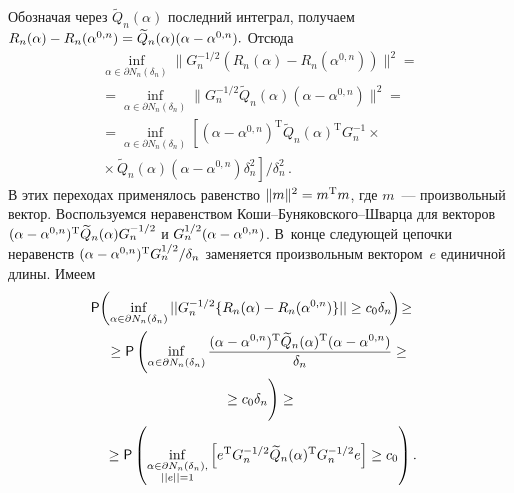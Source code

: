 \begin{multicols}{2}
Обозначая через $\widetilde{Q}_n(\alpha)$ последний интеграл, получаем 
$R_n(\alpha)\hm-R_n(\alpha^{0,n})\hm=\widetilde{Q}_n(\alpha)(\alpha\hm-\alpha^{0,n}).$ Отсюда
\begin{multline*}
\inf\limits_{\alpha\in\partial N_n(\delta_n)}\|G_n^{-1/2}(R_n(\alpha)-R_n(\alpha^{0,n}))\|^2={}\\
{}=\inf\limits_{\alpha\in\partial N_n(\delta_n)}\|G_n^{-1/2}\widetilde{Q}_n(\alpha)(\alpha-\alpha^{0,n})\|^2={}\\
{}=\inf\limits_{\alpha\in\partial N_n(\delta_n)}
\left[(\alpha-\alpha^{0,n})^{\mathrm{T}}\widetilde{Q}_n(\alpha)^{\mathrm{T}}G_n^{-1}\times{}\right.\\
\left.{}\times\widetilde{Q}_n(\alpha)
(\alpha-\alpha^{0,n})\delta_n^2\right]\Big /\delta_n^2\,.
\end{multline*}
В этих переходах применялось равенство $\|m\|^2\hm=m^{\mathrm{T}}m$, где $m$~--- произвольный вектор. 
Воспользуемся неравенством Ко\-ши--Бу\-ня\-ков\-ско\-го--Швар\-ца для 
векторов $(\alpha\hm-\alpha^{0,n})^{\mathrm{T}}\widetilde{Q}_n(\alpha)G_n^{-1/2}$ и 
$G_n^{1/2}(\alpha\hm-\alpha^{0,n})$. В~конце следующей цепочки неравенств 
$(\alpha\hm-\alpha^{0,n})^{\mathrm{T}}G_n^{1/2}/\delta_n$ заменяется произвольным вектором~$e$ 
единичной длины. Имеем
\begin{multline*}
\!\!\!\!\!\!\p\!\left(\inf\limits_{\alpha\in\partial N_n(\delta_n)}||G_n^{-1/2}\{R_n(\alpha)-
R_n(\alpha^{0,n})\}||\geq c_0\delta_n\!\right)\!\geq{}\hspace*{-1.26547pt}\\
{}\geq\p\left(\inf\limits_{\alpha\in\partial N_n(\delta_n)}\fr{
(\alpha-\alpha^{0,n})^{\mathrm{T}}\widetilde{Q}_n(\alpha)^{\mathrm{T}}(\alpha-\alpha^{0,n})}
{\delta_n}\geq{}\right.\\
\left.{}\geq c_0\delta_n
\vphantom{\fr{(\alpha-\alpha^{0,n})^{\mathrm{T}}\widetilde{Q}_n(\alpha)^{\mathrm{T}}(\alpha-\alpha^{0,n})}
{\delta_n}}
\right)\geq{}\\
{}\geq\p\left( \inf\limits_{\substack{{\alpha\in\partial N_n(\delta_n),}\\{||e||=1}}}
\left[e^{\mathrm{T}}G_n^{-1/2}\widetilde{Q}_n(\alpha)^{\mathrm{T}}G_n^{-1/2}e\right]\geq c_0\right).\hspace*{-1.757pt}
\end{multline*}


\end{multicols}
